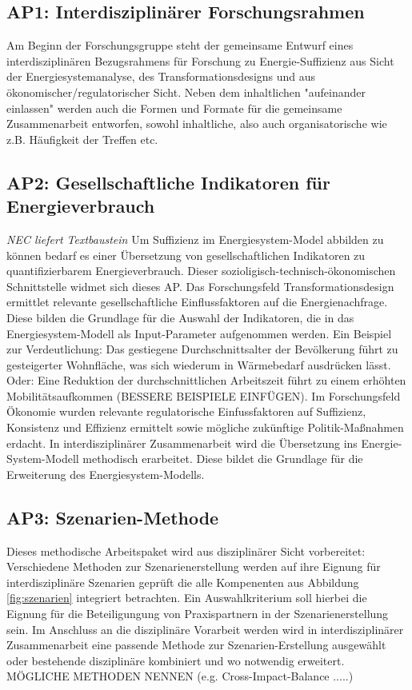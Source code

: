 \documentclass[a4paper,11pt,twoside]{scrartcl}
\begin{document}
\subsection*{AP1: Interdisziplinärer Forschungsrahmen}
Am Beginn der Forschungsgruppe steht der gemeinsame Entwurf eines interdisziplinären Bezugsrahmens für Forschung zu Energie-Suffizienz aus Sicht der Energiesystemanalyse, des Transformationsdesigns und aus ökonomischer/regulatorischer Sicht. Neben dem inhaltlichen "aufeinander einlassen" werden auch die Formen und Formate für die gemeinsame Zusammenarbeit entworfen, sowohl inhaltliche, also auch organisatorische wie z.B. Häufigkeit der Treffen etc.

\subsection*{AP2: Gesellschaftliche Indikatoren für Energieverbrauch}
\textit{NEC liefert Textbaustein}
Um Suffizienz im Energiesystem-Model abbilden zu können bedarf es einer Übersetzung von gesellschaftlichen Indikatoren zu quantifizierbarem Energieverbrauch. Dieser sozioligisch-technisch-ökonomischen Schnittstelle widmet sich dieses AP. Das Forschungsfeld Transformationsdesign ermittlet relevante gesellschaftliche Einflussfaktoren auf die Energienachfrage. Diese bilden die Grundlage für die Auswahl der Indikatoren, die in das Energiesystem-Modell als Input-Parameter aufgenommen werden. Ein Beispiel zur Verdeutlichung: Das gestiegene Durchschnittsalter der Bevölkerung führt zu gesteigerter Wohnfläche, was sich wiederum in Wärmebedarf ausdrücken lässt. Oder: Eine Reduktion der durchschnittlichen Arbeitszeit führt zu einem erhöhten Mobilitätsaufkommen (BESSERE BEISPIELE EINFÜGEN). Im Forschungsfeld Ökonomie wurden relevante regulatorische Einfussfaktoren auf Suffizienz, Konsistenz und Effizienz ermittelt sowie mögliche zukünftige Politik-Maßnahmen erdacht. In interdisziplinärer Zusammenarbeit wird die Übersetzung ins Energie-System-Modell methodisch erarbeitet. Diese bildet die Grundlage für die Erweiterung des Energiesystem-Modells.

\subsection*{AP3: Szenarien-Methode}
Dieses methodische Arbeitspaket wird aus disziplinärer Sicht vorbereitet: Verschiedene Methoden zur Szenarienerstellung werden auf ihre Eignung für interdisziplinäre Szenarien geprüft die alle Kompenenten aus Abbildung \ref{fig:szenarien} integriert betrachten. Ein Auswahlkriterium soll hierbei die Eignung für die Beteiligungung von Praxispartnern in der Szenarienerstellung sein. Im Anschluss an die disziplinäre Vorarbeit werden wird in interdisziplinärer Zusammenarbeit eine passende Methode zur Szenarien-Erstellung ausgewählt oder bestehende disziplinäre kombiniert und wo notwendig erweitert. MÖGLICHE METHODEN NENNEN (e.g. Cross-Impact-Balance .....)
\end{document}

